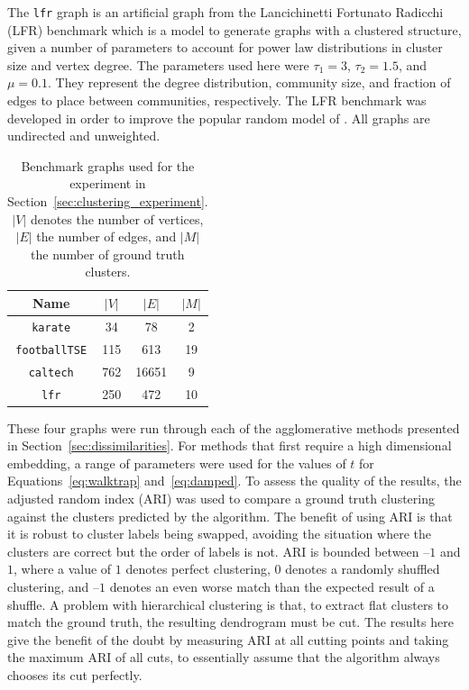 The \texttt{lfr} graph is an artificial graph from the Lancichinetti Fortunato Radicchi (LFR) benchmark \citep{Lancichinetti2008} which is a model to generate graphs with a clustered structure, given a number of parameters to account for power law distributions in cluster size and vertex degree. The parameters used here were $\tau_1=3$, $\tau_2=1.5$, and $\mu=0.1$. They represent the degree distribution, community size, and fraction of edges to place between communities, respectively. The LFR benchmark was developed in order to improve the popular random model of \citet{Girvan2002}.
All graphs are undirected and unweighted.

\begin{table}
  \centering
  \caption[Benchmark graphs used for the experiment in Section~\ref{sec:clustering_experiment}]{Benchmark graphs used for the experiment in Section~\ref{sec:clustering_experiment}. $|V|$ denotes the number of vertices, $|E|$ the number of edges, and $|M|$ the number of ground truth clusters.}
  \setlength{\tabcolsep}{1em} %
  {\renewcommand{\arraystretch}{1.25}%
  \begin{tabular}{|c|c|c|c|}
    \hline
    Name & $|V|$ & $|E|$ & $|M|$
    \\\hline\hline
    \texttt{karate} & 34 & 78 & 2
    \\\hline
    \texttt{footballTSE} & 115 & 613 & 19
    \\\hline
    \texttt{caltech} & 762 & 16651 & 9
    \\\hline
    \texttt{lfr} & 250 & 472 & 10
    \\\hline
  \end{tabular}}
  \label{tab:bundle_graphs}
\end{table}


These four graphs were run through each of the agglomerative methods presented in Section~\ref{sec:dissimilarities}. For methods that first require a high dimensional embedding, a range of parameters were used for the values of $t$ for Equations~\eqref{eq:walktrap} and~\eqref{eq:damped}.
To assess the quality of the results, the adjusted random index (ARI) was used to compare a ground truth clustering against the clusters predicted by the algorithm. The benefit of using ARI is that it is robust to cluster labels being swapped, avoiding the situation where the clusters are correct but the order of labels is not.
ARI is bounded between --$1$ and $1$, where a value of $1$ denotes perfect clustering, $0$ denotes a randomly shuffled clustering, and --$1$ denotes an even worse match than the expected result of a shuffle.
A problem with hierarchical clustering is that, to extract flat clusters to match the ground truth, the resulting dendrogram must be cut. The results here give the benefit of the doubt by measuring ARI at all cutting points and taking the maximum ARI of all cuts, to essentially assume that the algorithm always chooses its cut perfectly.

